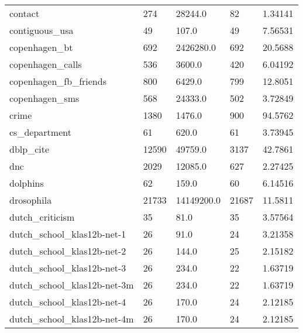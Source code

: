 \begin{longtable}{lllll}
 contact                                            & 274        & 28244.0     & 82    & 1.34141    \\
 contiguous\_usa                                     & 49         & 107.0       & 49    & 7.56531    \\
 copenhagen\_bt                                      & 692        & 2426280.0   & 692   & 20.5688    \\
 copenhagen\_calls                                   & 536        & 3600.0      & 420   & 6.04192    \\
 copenhagen\_fb\_friends                              & 800        & 6429.0      & 799   & 12.8051    \\
 copenhagen\_sms                                     & 568        & 24333.0     & 502   & 3.72849    \\
 crime                                              & 1380       & 1476.0      & 900   & 94.5762    \\
 cs\_department                                      & 61         & 620.0       & 61    & 3.73945    \\
 dblp\_cite                                          & 12590      & 49759.0     & 3137  & 42.7861    \\
 dnc                                                & 2029       & 12085.0     & 627   & 2.27425    \\
 dolphins                                           & 62         & 159.0       & 60    & 6.14516    \\
 drosophila                                         & 21733      & 14149200.0  & 21687 & 11.5811    \\
 dutch\_criticism                                    & 35         & 81.0        & 35    & 3.57564    \\
 dutch\_school\_klas12b-net-1                         & 26         & 91.0        & 24    & 3.21358    \\
 dutch\_school\_klas12b-net-2                         & 26         & 144.0       & 25    & 2.15182    \\
 dutch\_school\_klas12b-net-3                         & 26         & 234.0       & 22    & 1.63719    \\
 dutch\_school\_klas12b-net-3m                        & 26         & 234.0       & 22    & 1.63719    \\
 dutch\_school\_klas12b-net-4                         & 26         & 170.0       & 24    & 2.12185    \\
 dutch\_school\_klas12b-net-4m                        & 26         & 170.0       & 24    & 2.12185    \\

\end{longtable}
